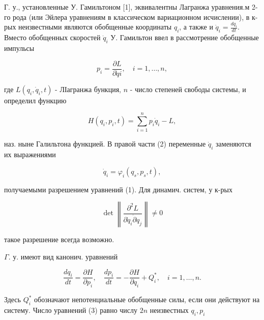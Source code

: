 \documentclass[10pt]{article}
\begin{document}
Г. у., установленные У. Гамильтоном [1], эквивалентны Лагранжа уравнения.м 2-го рода (или Эйлера уравнениям в классическом вариационном исчислении), в к-рых неизвестными являются обобщенные координаты $q_{i}$, а также и $\dot{q}_{i}=\frac{d q_{i}}{d t}$. Вместо обобщенных скоростей $\dot{q}_{i}$ У. Гамильтон ввел в рассмотрение обобщенные импульсы



\[

p_{i}=\frac{\partial L}{\partial \dot{q} i}, \quad i=1, \ldots, n,

\]



где $L\left(q_{i}, \dot{q}_{i}, t\right)$ - ЛІагранжа бункция, $n$ - число степеней свободы системы, и определил функцию



\[

H\left(q_{i}, p_{i}, t\right)=\sum_{i=1}^{n} p_{i} \dot{q}_{i}-L,

\]



наз. ныне Галильтона функцией. В правой части (2) переменные $\dot{q}_{i}$ заменяются их выражениями



\[

\dot{q}_{i}=\varphi_{i}\left(q_{s}, p_{s}, t\right),

\]



получаемыми разрешением уравнений (1). Для динамич. систем, у к-рых



\[

\operatorname{det}\left\|\frac{\partial^{2} L}{\partial \dot{q}_{i} \dot{\partial} q_{j}}\right\| \neq 0

\]



такое разрешение всегда возможно.



$\Gamma$. у. имеют вид канонич. уравнений



\[

\frac{d q_{i}}{d t}=\frac{\partial H}{\partial p_{i}}, \quad \frac{d p_{i}}{d t}=-\frac{\partial H}{\partial q_{i}}+Q_{i}^{*}, \quad i=1, \ldots, n .

\]



Здесь $Q_{i}^{*}$ обозначают непотенциальные обобщенные силы, если они действуют на систему. Число уравнений (3) равно числу $2 n$ неизвестных $q_{i}, p_{i}$
\end{document}
